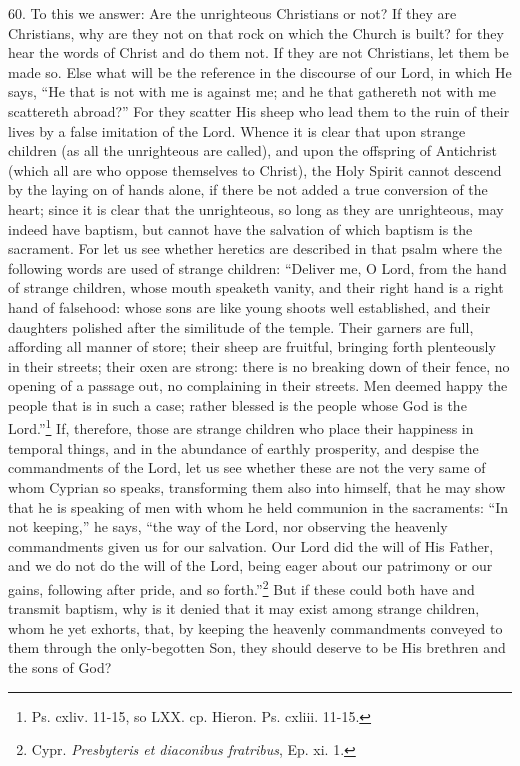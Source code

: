 60. To this we answer: Are the unrighteous Christians or not? If they are Christians, why are they not on that rock on which the Church is built? for they hear the words of Christ and do them not. If they are not Christians, let them be made so. Else what will be the reference in the discourse of our Lord, in which He says, ``He that is not with me is against me; and he that gathereth not with me scattereth abroad?'' For they scatter His sheep who lead them to the ruin of their lives by a false imitation of the Lord. Whence it is clear that upon strange children (as all the unrighteous are called), and upon the offspring of Antichrist (which all are who oppose themselves to Christ), the Holy Spirit cannot descend by the laying on of hands alone, if there be not added a true conversion of the heart; since it is clear that the unrighteous, so long as they are unrighteous, may indeed have baptism, but cannot have the salvation of which baptism is the sacrament. For let us see whether heretics are described in that psalm where the following words are used of strange children: ``Deliver me, O Lord, from the hand of strange children, whose mouth speaketh vanity, and their right hand is a right hand of falsehood: whose sons are like young shoots well established, and their daughters polished after the similitude of the temple. Their garners are full, affording all manner of store; their sheep are fruitful, bringing forth plenteously in their streets; their oxen are strong: there is no breaking down of their fence, no opening of a passage out, no complaining in their streets. Men deemed happy the people that is in such a case; rather blessed is the people whose God is the Lord.''\footnote{\par  Ps. cxliv. 11-15, so LXX. cp. Hieron. Ps. cxliii. 11-15.} If, therefore, those are strange children who place their happiness in temporal things, and in the abundance of earthly prosperity, and despise the commandments of the Lord, let us see whether these are not the very same of whom Cyprian so speaks, transforming them also into himself, that he may show that he is speaking of men with whom he held communion in the sacraments: ``In not keeping,'' he says, ``the way of the Lord, nor observing the heavenly commandments given us for our salvation. Our Lord did the will of His Father, and we do not do the will of the Lord, being eager about our patrimony or our gains, following after pride, and so forth.''\footnote{\par  Cypr. \emph{Presbyteris et diaconibus fratribus}, Ep. xi. 1.} But if these could both have and transmit baptism, why is it denied that it may exist among strange children, whom he yet exhorts, that, by keeping the heavenly commandments conveyed to them through the only-begotten Son, they should deserve to be His brethren and the sons of God?

